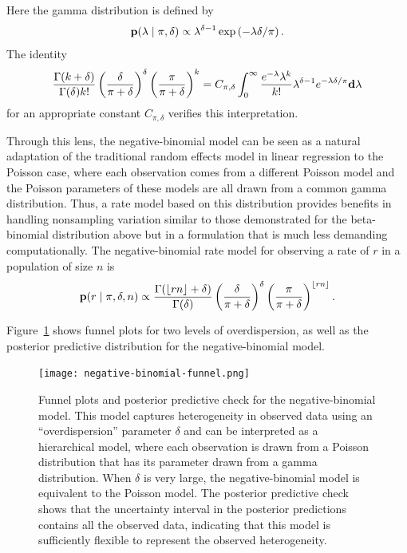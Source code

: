 Here the gamma distribution is defined by
\[
\mathbf{p}(\lambda \;|\; \pi, \delta) \propto \lambda^{\delta-1} \exp\left(-\lambda \delta/\pi \right).
\]
The identity
\[
\frac{\Gamma(k+\delta)}{\Gamma(\delta)k!} \left(\frac{\delta}{\pi+\delta}\right)^\delta \left(\frac{\pi}{\pi+\delta}\right)^k
=
 C_{\pi, \delta} \int_0^\infty \frac{e^{-\lambda}\lambda^k}{k!} \lambda^{\delta-1} e^{-\lambda \delta/\pi} \mathbf{d} \lambda
\]
for an appropriate constant $C_{\pi,\delta}$ verifies this interpretation.

Through this lens, the negative-binomial model can be seen as a
natural adaptation of the traditional random effects model in linear
regression to the Poisson case, where each observation comes from a
different Poisson model and the Poisson parameters of these models are
all drawn from a common gamma distribution. Thus, a rate model based on
this distribution provides benefits in handling nonsampling variation
similar to those demonstrated for the beta-binomial distribution
above but in a formulation that is much less demanding
computationally.  The negative-binomial rate model for observing a
rate of $r$ in a population of size $n$ is
\[
\mathbf{p}(r\;|\; \pi, \delta, n) \propto
 \frac{\Gamma(\lfloor rn \rfloor+\delta)}{\Gamma(\delta)}
 \left(\frac{\delta}{\pi+\delta}\right)^\delta \left(\frac{\pi}{\pi+\delta}\right)^{\lfloor rn\rfloor}.
\]

Figure~\ref{rate-model-negative-binomial-funnel} shows funnel plots
for two levels of overdispersion, as well as the posterior predictive
distribution for the negative-binomial model.

\begin{figure}[h!]
\begin{center}
\texttt{[image: negative-binomial-funnel.png]}
\end{center}
\caption[Funnel plots and posterior predictive check for the
  negative-binomial model.]{Funnel plots and posterior predictive check for the
  negative-binomial model. This model captures heterogeneity in
  observed data using an ``overdispersion'' parameter $\delta$ and
  can be interpreted as a hierarchical model, where each observation
  is drawn from a Poisson distribution that has its parameter drawn
  from a gamma distribution.  When $\delta$ is very large, the
  negative-binomial model is equivalent to the Poisson model.  The
  posterior predictive check shows that the uncertainty interval in the
  posterior predictions contains all the observed data, indicating
  that this model is sufficiently flexible to represent the observed
  heterogeneity.} \label{rate-model-negative-binomial-funnel}
\end{figure}

